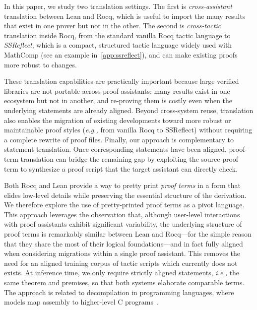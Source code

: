\documentclass{article}
\theoremstyle{plain}
\theoremstyle{definition}
\theoremstyle{remark}
\newcommand{\ie}{\emph{i.e.,}\xspace}
\newcommand{\eg}{\emph{e.g.,}\xspace}
\begin{document}
        In this paper, we study two translation
        settings. The first is \emph{cross-assistant} translation
        between Lean and Rocq, which is useful to import the many
        results that exist in one prover but not in the other. The
        second is \emph{cross-tactic} translation inside Rocq, from
        the standard vanilla Rocq tactic language to \textit{SSReflect}, which is a
        compact, structured tactic language widely used with MathComp
        (see an example in~\cref{app:ssreflect}), and can make
        existing proofs more robust to changes.
	
        These translation capabilities are practically important
        because large verified libraries are not portable across proof
        assistants: many results exist in one ecosystem but not in
        another, and re-proving them is costly even when the
        underlying statements are already aligned.
%
        Beyond cross-system reuse, translation also enables the
        migration of existing developments toward more robust or
        maintainable proof styles (\eg from vanilla Rocq to
        SSReflect) without requiring a complete rewrite of proof
        files.
%
        Finally, our approach is complementary to statement
        translation. Once corresponding statements have been aligned,
        proof-term translation can bridge the remaining gap by
        exploiting the source proof term to synthesize a proof script
        that the target assistant can directly check.
	
	Both Rocq and Lean provide a way to pretty print \emph{proof
          terms} in a form that elides low-level details while
        preserving the essential structure of the derivation. We
        therefore explore the use of pretty-printed proof terms as a
        pivot language.
%
        This approach leverages the observation that, although
        user-level interactions with proof assistants exhibit
        significant variability, the underlying structure of proof
        terms is remarkably similar between Lean and Rocq---for the
        simple reason that they share the most of their logical foundations---and in
        fact fully aligned when considering migrations within a single
        proof assistant.
        This removes the need for an aligned training corpus of tactic
        scripts which currently does not exists. At inference time, we only require strictly aligned
        statements, \ie the same theorem and premises, so that both
        systems elaborate comparable terms. The approach is related to
        decompilation in programming languages, where models map
        assembly to higher-level C programs~\cite{llm4decompile2024}.
	
\end{document}
